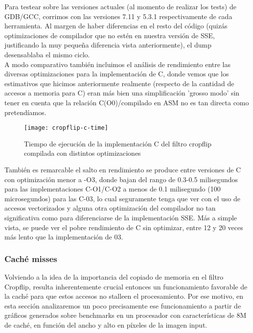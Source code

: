 Para testear sobre las versiones actuales (al momento de realizar los tests) de GDB/GCC, corrimos con las versiones 7.11 y 5.3.1 respectivamente de cada herramienta. Al margen de haber diferencias en el resto del código (quizás optimizaciones de compilador que no estén en nuestra versión de SSE, justificando la muy pequeña diferencia vista anteriormente), el dump desensablaba el mismo ciclo.
\\

A modo comparativo también incluimos el análisis de rendimiento entre las diversas optimizaciones para la implementación de C, donde vemos que los estimativos que hicimos anteriormente realmente (respecto de la cantidad de accesos a memoria para C) eran más bien una simplificación 'grosso modo' sin tener en cuenta que la relación C(O$0$)/compilado en ASM no es tan directa como pretendíamos.
\\

\begin{figure}[H]
\centering
\texttt{[image: cropflip-c-time]}
\label{fig:cropflip-c-time}
\caption{Tiempo de ejecución de la implementación C del filtro cropflip compilada con distintos optimizaciones}
\end{figure}

También es remarcable el salto en rendimiento se produce entre versiones de C con optimización menor a -O3, donde bajan del rango de 0.3-0.5 milisegundos para las implementaciones C-O1/C-O2 a menos de 0.1 milisegundo (100 microsegundos)  para las C-03, lo cual seguramente tenga que ver con el uso de accesos vectorizados y alguna otra optimización del compilador no tan significativa como para diferenciarse de la implementación SSE.
Más a simple vista, se puede ver el pobre rendimiento de C sin optimizar, entre 12 y 20 veces más lento que la implementación de 03.
\\

\subsubsection{Caché misses}

Volviendo a la idea de la importancia del copiado de memoria en el filtro Cropflip, resulta inherentemente crucial entonces un funcionamiento favorable de la caché para que estos accesos no stalleen el procesamiento. Por ese motivo, en esta sección analizaremos un poco precisamente ese funcionamiento a partir de gráficos generados sobre benchmarks en un procesador con características de 8M de caché, en función del ancho y alto en píxeles de la imagen input.


